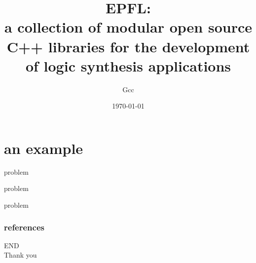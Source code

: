 \documentclass[aspectratio=1610]{beamer}
\title{EPFL: \\a collection of modular open source C++ libraries for the development of logic synthesis applications}
\author{Gcc}
\date\today
\begin{document}
\begin{frame}[plain]
  \titlepage
\end{frame}

\section{an example}
\begin{frame}{problem}
\end{frame}
\begin{frame}{problem}
\end{frame}
\begin{frame}{problem}
\end{frame}
\begin{frame}
	\frametitle{references}
	\printbibliography
\end{frame}
\begin{frame}
\Huge{END\\Thank you}
\end{frame}
\end{document}
